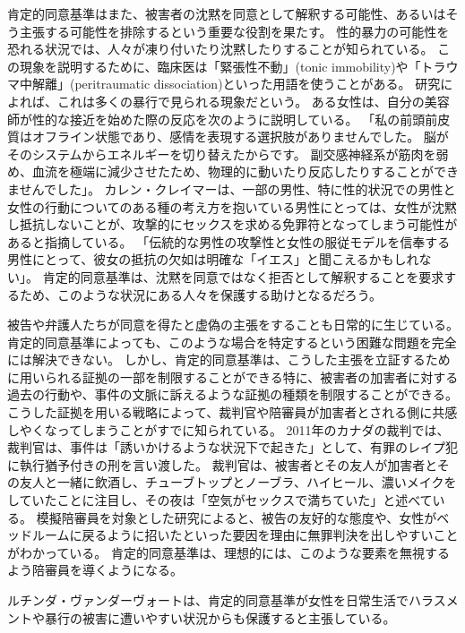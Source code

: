 \documentclass[paper=a4,book,openany]{jlreq} \usepackage{mystyle}
\begin{document}
肯定的同意基準はまた、被害者の沈黙を同意として解釈する可能性、あるいはそう主張する可能性を排除するという重要な役割を果たす。
性的暴力の可能性を恐れる状況では、人々が凍り付いたり沈黙したりすることが知られている。
この現象を説明するために、臨床医は「緊張性不動」(tonic immobility)や「トラウマ中解離」(peritraumatic dissociation)といった用語を使うことがある。
研究によれば、これは多くの暴行で見られる現象だという\citep{moller17:_tonic_immob_durin_sexual_assaul}。
ある女性は、自分の美容師が性的な接近を始めた際の反応を次のように説明している。
「私の前頭前皮質はオフライン状態であり、感情を表現する選択肢がありませんでした。
脳がそのシステムからエネルギーを切り替えたからです。
副交感神経系が筋肉を弱め、血流を極端に減少させたため、物理的に動いたり反応したりすることができませんでした」\citep{corvo18:_why_i_froze_smiled_durin}。
カレン・クレイマーは、一部の男性、特に性的状況での男性と女性の行動についてのある種の考え方を抱いている男性にとっては、女性が沈黙し抵抗しないことが、攻撃的にセックスを求める免罪符となってしまう可能性があると指摘している。
「伝統的な男性の攻撃性と女性の服従モデルを信奉する男性にとって、彼女の抵抗の欠如は明確な「イエス」と聞こえるかもしれない」\citep[p.121]{kramer94:_rule_myth}。
肯定的同意基準は、沈黙を同意ではなく拒否として解釈することを要求するため、このような状況にある人々を保護する助けとなるだろう。

被告や弁護人たちが同意を得たと虚偽の主張をすることも日常的に生じている。
肯定的同意基準によっても、このような場合を特定するという困難な問題を完全には解決できない。
しかし、肯定的同意基準は、こうした主張を立証するために用いられる証拠の一部を制限することができる{\DDASH}特に、被害者の加害者に対する過去の行動や、事件の文脈に訴えるような証拠の種類を制限することができる。
こうした証拠を用いる戦略によって、裁判官や陪審員が加害者とされる側に共感しやくなってしまうことがすでに知られている。
2011年のカナダの裁判では、裁判官は、事件は「誘いかけるような状況下で起きた」として、有罪のレイプ犯に執行猶予付きの刑を言い渡した。
裁判官は、被害者とその友人が加害者とその友人と一緒に飲酒し、チューブトップとノーブラ、ハイヒール、濃いメイクをしていたことに注目し、その夜は「空気がセックスで満ちていた」と述べている\citep{cbc11:_manit_judge_rebuk_sex_assaul_remar}。
模擬陪審員を対象とした研究によると、被告の友好的な態度や、女性がベッドルームに戻るように招いたといった要因を理由に無罪判決を出しやすいことがわかっている\citep{finch06:_break_bound}。
肯定的同意基準は、理想的には、このような要素を無視するよう陪審員を導くようになる。

ルチンダ・ヴァンダーヴォートは、肯定的同意基準が女性を日常生活でハラスメントや暴行の被害に遭いやすい状況からも保護すると主張している。
\end{document}
